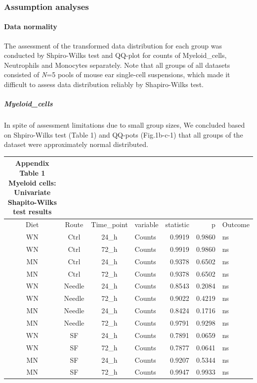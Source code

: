 \documentclass[
  12pt,
  letterpaper,
]{article}
\begin{document}
\subsubsection{Assumption analyses}\label{assumption-analyses}

\paragraph{Data normality}\label{data-normality}

The assessment of the transformed data distribution for each group was conducted by Shpiro-Wilks test and QQ-plot for counts of Myeloid\_cells, Neutrophils and Monocytes separately. Note that all groups of all datasets consisted of \emph{N}=5 pools of mouse ear single-cell suspensions, which made it difficult to assess data distribution reliably by Shapiro-Wilks test.

\subparagraph{Myeloid\_cells}\label{myeloid_cells}

In spite of assessment limitations due to small group sizes, We concluded based on Shpiro-Wilks test (Table 1) and QQ-pots (Fig.1b-c-1) that all groups of the dataset were approximately normal distributed.

\begin{longtable}{ccclrrl}
\caption*{
{\large \textbf{Appendix Table 1}} \\ 
{\small \textbf{Myeloid cells: Univariate Shapito-Wilks test results}}
} \\ 
\toprule
Diet & Route & Time\_point & variable & statistic & p & Outcome \\ 
\midrule\addlinespace[2.5pt]
WN & Ctrl & 24\_h & Counts & 0.9919 & 0.9860 & ns \\ 
WN & Ctrl & 72\_h & Counts & 0.9919 & 0.9860 & ns \\ 
MN & Ctrl & 24\_h & Counts & 0.9378 & 0.6502 & ns \\ 
MN & Ctrl & 72\_h & Counts & 0.9378 & 0.6502 & ns \\ 
WN & Needle & 24\_h & Counts & 0.8543 & 0.2084 & ns \\ 
WN & Needle & 72\_h & Counts & 0.9022 & 0.4219 & ns \\ 
MN & Needle & 24\_h & Counts & 0.8424 & 0.1716 & ns \\ 
MN & Needle & 72\_h & Counts & 0.9791 & 0.9298 & ns \\ 
WN & SF & 24\_h & Counts & 0.7891 & 0.0659 & ns \\ 
WN & SF & 72\_h & Counts & 0.7877 & 0.0641 & ns \\ 
MN & SF & 24\_h & Counts & 0.9207 & 0.5344 & ns \\ 
MN & SF & 72\_h & Counts & 0.9947 & 0.9933 & ns \\ 
\bottomrule
\end{longtable}
\end{document}
